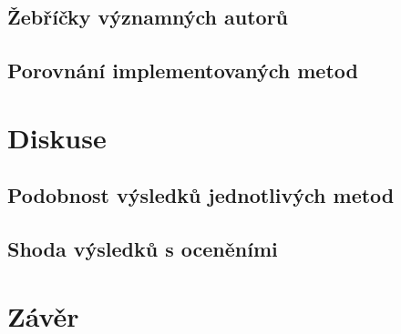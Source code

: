 \documentclass[12pt]{report}
\begin{document}
\section{Žebříčky významných autorů}
\lipsum

\section{Porovnání implementovaných metod}
\lipsum

\chapter{Diskuse}
\lipsum
\section{Podobnost výsledků jednotlivých metod}

\section{Shoda výsledků s oceněními}

\chapter{Závěr}
\lipsum



\end{document}
